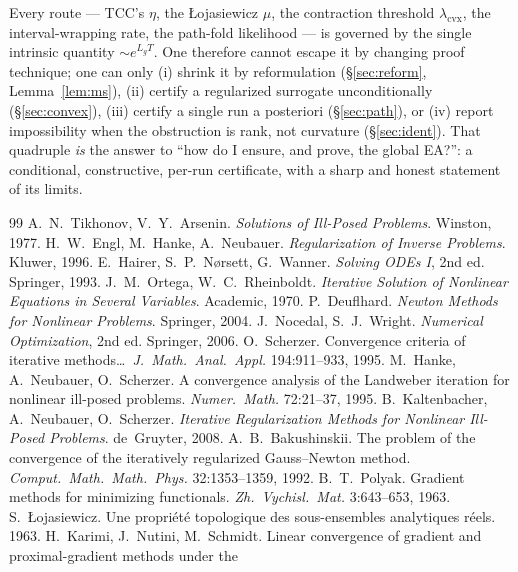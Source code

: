 \documentclass[11pt]{article}
\theoremstyle{plain}
\theoremstyle{definition}
\theoremstyle{remark}
\begin{document}
Every route --- TCC's $\eta$, the {\L}ojasiewicz $\mu$, the contraction
threshold $\lambda_{\mathrm{cvx}}$, the interval-wrapping rate, the
path-fold likelihood --- is governed by the single intrinsic quantity
$\sim e^{L_gT}$. One therefore cannot escape it by changing proof
technique; one can only (i) shrink it by reformulation
(\S\ref{sec:reform}, Lemma~\ref{lem:ms}), (ii) certify a regularized
surrogate unconditionally (\S\ref{sec:convex}), (iii) certify a single
run a posteriori (\S\ref{sec:path}), or (iv) report impossibility when
the obstruction is rank, not curvature (\S\ref{sec:ident}). That
quadruple \emph{is} the answer to ``how do I ensure, and prove, the
global EA?'': a conditional, constructive, per-run certificate, with a
sharp and honest statement of its limits.

\begin{thebibliography}{99}
 A.~N.~Tikhonov, V.~Y.~Arsenin.
 \textit{Solutions of Ill-Posed Problems}. Winston, 1977.
 H.~W.~Engl, M.~Hanke, A.~Neubauer.
 \textit{Regularization of Inverse Problems}. Kluwer, 1996.
 E.~Hairer, S.~P.~N\o rsett, G.~Wanner.
 \textit{Solving ODEs I}, 2nd ed. Springer, 1993.
 J.~M.~Ortega, W.~C.~Rheinboldt. \textit{Iterative
 Solution of Nonlinear Equations in Several Variables}. Academic, 1970.
 P.~Deuflhard. \textit{Newton Methods for
 Nonlinear Problems}. Springer, 2004.
 J.~Nocedal, S.~J.~Wright. \textit{Numerical
 Optimization}, 2nd ed. Springer, 2006.
 O.~Scherzer. Convergence criteria of iterative
 methods\dots\ \textit{J.~Math.\ Anal.\ Appl.} 194:911--933, 1995.
 M.~Hanke, A.~Neubauer, O.~Scherzer. A convergence
 analysis of the Landweber iteration for nonlinear ill-posed problems.
 \textit{Numer.\ Math.} 72:21--37, 1995.
 B.~Kaltenbacher, A.~Neubauer, O.~Scherzer.
 \textit{Iterative Regularization Methods for Nonlinear Ill-Posed
 Problems}. de~Gruyter, 2008.
 A.~B.~Bakushinskii. The problem of the
 convergence of the iteratively regularized Gauss--Newton method.
 \textit{Comput.\ Math.\ Math.\ Phys.} 32:1353--1359, 1992.
 B.~T.~Polyak. Gradient methods for minimizing
 functionals. \textit{Zh.\ Vychisl.\ Mat.} 3:643--653, 1963.
 S.~{\L}ojasiewicz. Une propri\'et\'e
 topologique des sous-ensembles analytiques r\'eels. 1963.
 H.~Karimi, J.~Nutini, M.~Schmidt. Linear convergence
 of gradient and proximal-gradient methods under the

\end{thebibliography}
\end{document}
